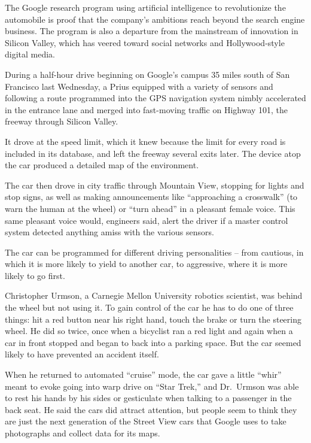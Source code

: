 ﻿\documentclass[12pt]{article}
\begin{document}
The Google research program using artificial intelligence to revolutionize the automobile is proof
that the company's ambitions reach beyond the search engine business. The program is also a
departure from the mainstream of innovation in Silicon Valley, which has veered toward social
networks and Hollywood-style digital media.

During a half-hour drive beginning on Google's campus 35 miles south of San Francisco last
Wednesday, a Prius equipped with a variety of sensors and following a route programmed into the GPS
navigation system nimbly accelerated in the entrance lane and merged into fast-moving traffic on
Highway 101, the freeway through Silicon Valley.

It drove at the speed limit, which it knew because the limit for every road is included in its
database, and left the freeway several exits later. The device atop the car produced a detailed map
of the environment.

The car then drove in city traffic through Mountain View, stopping for lights and stop signs, as
well as making announcements like ``approaching a crosswalk'' (to warn the human at the wheel) or
``turn ahead'' in a pleasant female voice. This same pleasant voice would, engineers said, alert the
driver if a master control system detected anything amiss with the various sensors.

The car can be programmed for different driving personalities -- from cautious, in which it is more
likely to yield to another car, to aggressive, where it is more likely to go first.

Christopher Urmson, a Carnegie Mellon University robotics scientist, was behind the wheel but not
using it. To gain control of the car he has to do one of three things: hit a red button near his
right hand, touch the brake or turn the steering wheel. He did so twice, once when a bicyclist ran a
red light and again when a car in front stopped and began to back into a parking space. But the car
seemed likely to have prevented an accident itself.

When he returned to automated ``cruise'' mode, the car gave a little ``whir'' meant to evoke going
into warp drive on ``Star Trek,'' and Dr.~Urmson was able to rest his hands by his sides or
gesticulate when talking to a passenger in the back seat. He said the cars did attract attention,
but people seem to think they are just the next generation of the Street View cars that Google uses
to take photographs and collect data for its maps.
\end{document}
